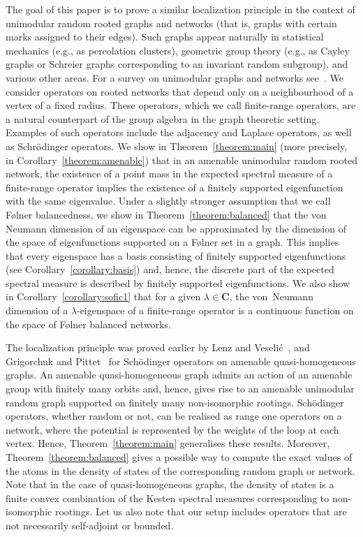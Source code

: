 \documentclass[english]{article}
\theoremstyle{definition}
\newcommand*{\field}[1]{\mathbf{#1}} %
\newcommand*\C{\field{C}} %
\begin{document}
The goal of this paper is to prove a similar localization principle in the context of unimodular random rooted graphs and networks (that is, graphs with certain marks assigned to their edges). Such graphs appear naturally in statistical mechanics (e.g., as percolation clusters), geometric group theory (e.g., as Cayley graphs or Schreier graphs corresponding to an invariant random subgroup), and various other areas. For a survey on unimodular graphs and networks see~\cite{AL07}. 
We consider operators on rooted networks that depend only on a neighbourhood of a vertex of a fixed radius. These operators, which we call finite-range operators, are a natural counterpart of the group algebra in the graph theoretic setting. Examples of such operators include the adjacency and Laplace operators, as well as Schrödinger operators. We show in Theorem~\ref{theorem:main} (more precisely, in Corollary~\ref{theorem:amenable}) that in an amenable unimodular random rooted network, the existence of a point mass in the expected spectral measure of a finite-range operator implies the existence of a finitely supported eigenfunction with the same eigenvalue. Under a slightly stronger assumption that we call {F\o lner} balancedness, we show in Theorem~\ref{theorem:balanced} that the von Neumann dimension of an eigenspace can be approximated by the dimension of the space of eigenfunctions supported on a F\o lner set in a graph. This implies that every eigenspace has a basis consisting of finitely supported eigenfunctions (see Corollary~\ref{corollary:basis}) and, hence, the discrete part of the expected spectral measure is described by finitely supported eigenfunctions. We also show in Corollary~\ref{corollary:sofic1} that for a given $\lambda\in \C$, the von~Neumann dimension of a $\lambda$-eigenspace of a finite-range operator is a continuous function on the space of {F\o lner} balanced networks. 


The localization principle was proved earlier by Lenz and Veseli{\'c}~\cite{LV}, and Grigorchuk and Pittet~\cite{GP} for Sch\"odinger operators on amenable quasi-homogeneous graphs.  An amenable quasi-homogeneous graph admits an action of an amenable group with finitely many orbits and, hence, gives rise to an amenable unimodular random graph supported on finitely many non-isomorphic rootings. Sch\"odinger operators, whether random or not, can be realised as range one operators on a network, where the potential is represented by the weights of the loop at each vertex. Hence, Theorem~\ref{theorem:main} generalises these results. Moreover, Theorem~\ref{theorem:balanced} gives a possible way to compute the exact values of the atoms in the density of states of the corresponding random graph or network. Note that in the case of quasi-homogeneous graphs, the density of states is a finite convex combination of the Kesten spectral measures corresponding to non-isomorphic rootings. Let us also note that our setup includes operators that are not necessarily self-adjoint or bounded. %
\end{document}
